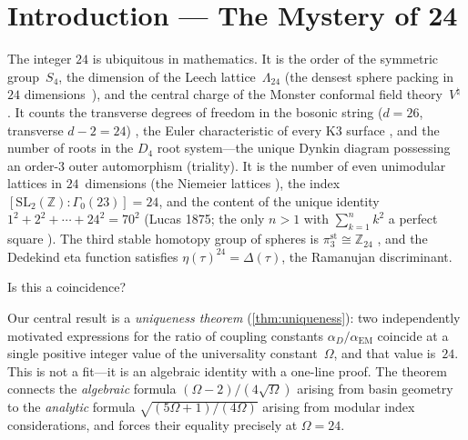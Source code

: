\documentclass[11pt,a4paper]{article}
\theoremstyle{plain}
\theoremstyle{remark}
\renewcommand{\Omega}{\varOmega}
\newcommand{\Z}{\mathbb{Z}}
\newcommand{\SL}{\mathrm{SL}}
\newcommand{\aD}{\alpha_D}
\newcommand{\aEM}{\alpha_{\mathrm{EM}}}
\begin{document}
\vspace{4pt}
\noindent
{}
\vspace{4pt}

\section{Introduction --- The Mystery of 24}
\label{sec:intro}

The integer $24$ is ubiquitous in mathematics.
It is the order of the symmetric group~$S_4$, the dimension of the Leech
lattice~$\Lambda_{24}$ (the densest sphere packing
in~$24$ dimensions~\cite{cohn-kumar-miller-radchenko-viazovska2017}), and the central
charge of the Monster conformal field theory~$V^\natural$
\cite{frenkel-lepowsky-meurman1988}.  It counts the transverse degrees of
freedom in the bosonic string ($d=26$, transverse $d-2=24$)
\cite{green-schwarz-witten1987}, the Euler characteristic of every K3
surface \cite{huybrechts2016}, and the number of roots in the $D_4$ root
system---the unique Dynkin diagram possessing an order-$3$ outer
automorphism (triality).  It is the number of even unimodular lattices in
$24$~dimensions (the Niemeier lattices \cite{niemeier1973}), the index
$[\SL_2(\Z):\Gamma_0(23)] = 24$, and the content of the unique identity
$1^2+2^2+\cdots+24^2 = 70^2$ (Lucas 1875; the only $n>1$ with
$\sum_{k=1}^{n}k^2$ a perfect square \cite{lucas1875}).
The third stable homotopy group of spheres is $\pi_3^{\mathrm{st}}
\cong\Z_{24}$ \cite{ravenel1986}, and the Dedekind eta function satisfies
$\eta(\tau)^{24}=\Delta(\tau)$, the Ramanujan discriminant.

\smallskip
Is this a coincidence?

\smallskip
Our central result is a \emph{uniqueness theorem} (\cref{thm:uniqueness}):
two independently motivated expressions for the ratio of coupling constants
$\aD/\aEM$ coincide at a single positive integer value of the universality
constant~$\Omega$, and that value is~$24$.  This is not a fit---it is an
algebraic identity with a one-line proof.  The theorem connects the
\emph{algebraic} formula $(\Omega-2)/(4\sqrt{\Omega})$ arising from
basin geometry to the \emph{analytic} formula $\sqrt{(5\Omega+1)/(4\Omega)}$
arising from modular index considerations, and forces their equality
precisely at $\Omega=24$.
\end{document}
